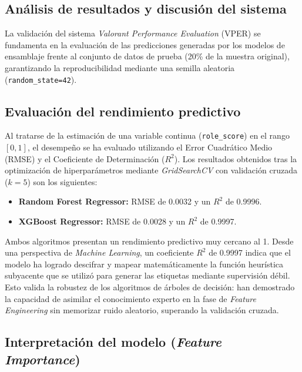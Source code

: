 \documentclass{ULBreport} %
\begin{document}
\begin{itemize}
\section{Análisis de resultados y discusión del sistema}

La validación del sistema \textit{Valorant Performance Evaluation} (VPER) se fundamenta en la evaluación de las predicciones generadas por los modelos de ensamblaje frente al conjunto de datos de prueba (20\% de la muestra original), garantizando la reproducibilidad mediante una semilla aleatoria (\texttt{random\_state=42}). 

\subsection{Evaluación del rendimiento predictivo}

Al tratarse de la estimación de una variable continua (\texttt{role\_score}) en el rango $[0,1]$, el desempeño se ha evaluado utilizando el Error Cuadrático Medio (RMSE) y el Coeficiente de Determinación ($R^2$). Los resultados obtenidos tras la optimización de hiperparámetros mediante \textit{GridSearchCV} con validación cruzada ($k=5$) son los siguientes:

\begin{itemize}
    \item \textbf{Random Forest Regressor:} RMSE de 0.0032 y un $R^2$ de 0.9996.
    \item \textbf{XGBoost Regressor:} RMSE de 0.0028 y un $R^2$ de 0.9997.
\end{itemize}

Ambos algoritmos presentan un rendimiento predictivo muy cercano al 1. Desde una perspectiva de \textit{Machine Learning}, un coeficiente $R^2$ de 0.9997 indica que el modelo ha logrado descifrar y mapear matemáticamente la función heurística subyacente que se utilizó para generar las etiquetas mediante supervisión débil. Esto valida la robustez de los algoritmos de árboles de decisión: han demostrado la capacidad de asimilar el conocimiento experto en la fase de \textit{Feature Engineering} sin memorizar ruido aleatorio, superando la validación cruzada.

\subsection{Interpretación del modelo (\textit{Feature Importance})}


\end{itemize}
\end{document}
